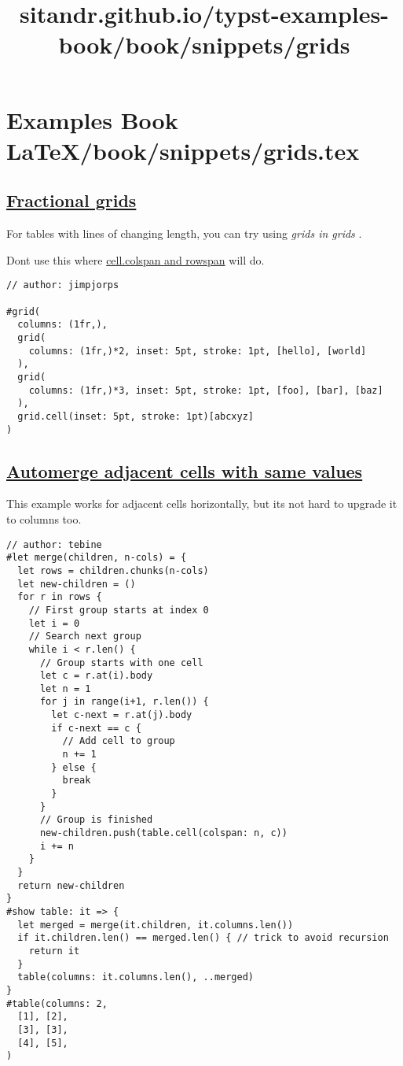 \pandocbounded{}


\section{Examples Book LaTeX/book/snippets/grids.tex}
\title{sitandr.github.io/typst-examples-book/book/snippets/grids}

\subsection{\texorpdfstring{\hyperref[fractional-grids]{Fractional
grids}}{Fractional grids}}\label{fractional-grids}

For tables with lines of changing length, you can try using \emph{grids
in grids} .

Don\textquotesingle t use this where
\href{https://typst.app/docs/reference/model/table/\#definitions-cell-colspan}{cell.colspan
and rowspan} will do.

\begin{verbatim}
// author: jimpjorps

#grid(
  columns: (1fr,),
  grid(
    columns: (1fr,)*2, inset: 5pt, stroke: 1pt, [hello], [world]
  ),
  grid(
    columns: (1fr,)*3, inset: 5pt, stroke: 1pt, [foo], [bar], [baz]
  ),
  grid.cell(inset: 5pt, stroke: 1pt)[abcxyz]
)
\end{verbatim}

\pandocbounded{}

\subsection{\texorpdfstring{\hyperref[automerge-adjacent-cells-with-same-values]{Automerge
adjacent cells with same
values}}{Automerge adjacent cells with same values}}\label{automerge-adjacent-cells-with-same-values}

This example works for adjacent cells horizontally, but
it\textquotesingle s not hard to upgrade it to columns too.

\begin{verbatim}
// author: tebine
#let merge(children, n-cols) = {
  let rows = children.chunks(n-cols)
  let new-children = ()
  for r in rows {
    // First group starts at index 0
    let i = 0 
    // Search next group
    while i < r.len() {
      // Group starts with one cell
      let c = r.at(i).body
      let n = 1
      for j in range(i+1, r.len()) {
        let c-next = r.at(j).body
        if c-next == c {
          // Add cell to group
          n += 1
        } else {
          break
        }
      }
      // Group is finished
      new-children.push(table.cell(colspan: n, c))
      i += n
    }
  }
  return new-children
}
#show table: it => {
  let merged = merge(it.children, it.columns.len())
  if it.children.len() == merged.len() { // trick to avoid recursion
    return it
  }
  table(columns: it.columns.len(), ..merged)
}
#table(columns: 2,
  [1], [2],
  [3], [3],
  [4], [5],
)
\end{verbatim}

